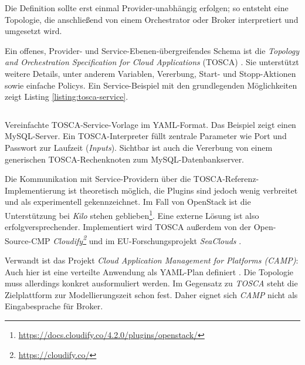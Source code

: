 \begin{description}
	Die Definition sollte erst einmal Provider-unabhängig erfolgen; so entsteht eine Topologie, die anschließend von einem Orchestrator oder Broker interpretiert und umgesetzt wird.
	
	Ein offenes, Provider- und Service-Ebenen-übergreifendes Schema ist die \emph{Topology and Orchestration Specification for Cloud Applications} (TOSCA) \cite{oasis:2018:tosca-simple}. Sie unterstützt	weitere Details, unter anderem Variablen, Vererbung, Start- und Stopp-Aktionen sowie einfache Policys. Ein Service-Beispiel mit den grundlegenden Möglichkeiten zeigt Listing \ref{listing:tosca-service}.
	
	\begin{listing}[ht]	
		\inputminted[]{yaml}{./src/TOSCA.service.sample.yaml}
		\caption{Vereinfachte TOSCA-Service-Vorlage im YAML-Format. Das Beispiel zeigt einen MySQL-Server. Ein TOSCA-Interpreter füllt zentrale Parameter wie Port und Passwort zur Laufzeit (\emph{Inputs}). Sichtbar ist auch die Vererbung von einem generischen TOSCA-Rechenknoten zum MySQL-Datenbankserver.}
		\label{listing:tosca-service}
	\end{listing}
	
	Die Kommunikation mit Service-Providern über die TOSCA-Referenz-Implementierung ist theoretisch möglich, die Plugins sind jedoch wenig verbreitet und als experimentell gekennzeichnet. Im Fall von OpenStack ist die Unterstützung bei \emph{Kilo} stehen geblieben\footnote{\url{https://docs.cloudify.co/4.2.0/plugins/openstack/}}. Eine externe Lösung ist also erfolgversprechender. Implementiert wird TOSCA außerdem von der Open-Source-CMP \emph{Cloudify\footnote{\url{https://cloudify.co/}}} und im EU-Forschungsprojekt \emph{SeaClouds} \cite{seaclouds:2015:architecture}.
	
	Verwandt ist das Projekt \emph{Cloud Application Management for Platforms (CAMP)}: Auch hier ist eine verteilte Anwendung als YAML-Plan definiert \cite{oasis:2014:camp}. Die Topologie muss allerdings konkret ausformuliert werden. Im Gegensatz zu \emph{TOSCA} steht die Zielplattform zur Modellierungszeit schon fest. Daher eignet sich \emph{CAMP} nicht als Eingabesprache für Broker.
	

	

\end{description}
